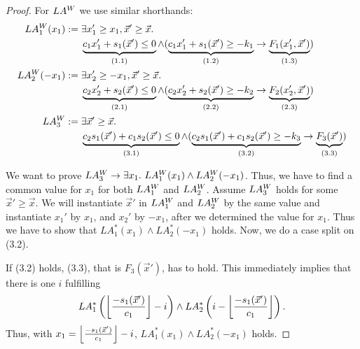 \begin{techreport}
\begin{proof}
For $LA^W$ we use similar shorthands:
\begin{align*}
LA\W_1(x_1) & := 
 \exists x'_1\geq x_1,\vec x'\geq \vec x.\ \\
    & \phantom{{}:={}}
    \underbrace{c_1 x_1' + s_1(\vec x') \leq 0    }_{(1.1)} \land
   (\underbrace{c_1 x_1' + s_1(\vec x') \geq -k_1 }_{(1.2)} \rightarrow
    \underbrace{F_1 (x_1', \vec x')               }_{(1.3)}) \\
%
LA\W_2(-x_1) & := 
 \exists x'_2\geq -x_1,\vec x'\geq \vec x.\ \\
    & \phantom{{}:={}}
   \underbrace{c_2 x_2' + s_2(\vec x') \leq 0     }_{(2.1)} \land
  (\underbrace{c_2 x_2' + s_2(\vec x') \geq -k_2  }_{(2.2)} \rightarrow
   \underbrace{F_2 (x_2', \vec x')                }_{(2.3)}) \\
%
LA\W_3 & := 
 \exists \vec x'\geq \vec x.\ \\
    & \phantom{{}:={}}
   \underbrace{c_2 s_1(\vec x') + c_1 s_2(\vec x') \leq 0    }_{(3.1)} \land
  (\underbrace{c_2 s_1(\vec x') + c_1 s_2(\vec x') \geq -k_3 }_{(3.2)} \rightarrow 
   \underbrace{F_3(\vec x')                                  }_{(3.3)} ) \\
\end{align*}

We want to prove $LA^W_3 \rightarrow \exists x_1.\ LA^W_1(x_1) \land
LA^W_2(-x_1)$.  Thus, we have to find a common value for $x_1$ for both
$LA^W_1$ and $LA^W_2$.  Assume $LA^W_3$ holds for some $\vec x' \geq \vec x$.
We will instantiate $\vec x'$ in $LA^W_1$ and $LA^W_2$ by the same value and
instantiate $x_1'$ by $x_1$, and $x_2'$ by $-x_1$, after we determined the
value for $x_1$.  Thus we have to show that $LA^*_1(x_1) \wedge LA^*_2(-x_1)$
holds. Now, we do a case split on (3.2).

If (3.2) holds, (3.3), that is $F_3(\vec x')$, has to hold. This immediately implies that 
there is one $i$ fulfilling 
\[ LA^*_1\left(\left\lfloor \frac{-s_1(\vec x')}{c_1} \right\rfloor - i\right) \land LA^*_2\left(i-\left\lfloor \frac{-s_1(\vec x')}{c_1} \right\rfloor\right).\]
Thus, with $x_1 = \left\lfloor \frac{-s_1(\vec x')}{c_1} \right\rfloor - i$, $LA^*_1(x_1) \wedge LA^*_2(-x_1)$ holds.


\end{proof}
\end{techreport}
